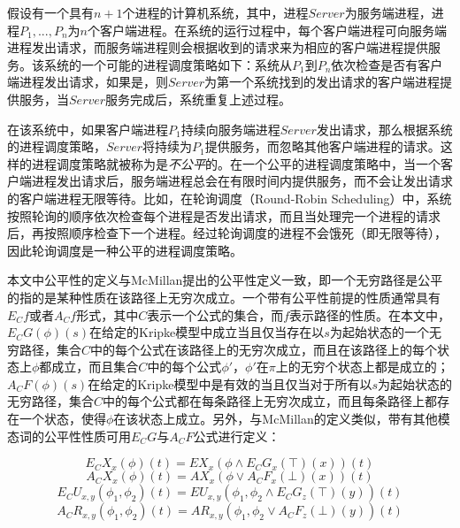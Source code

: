\begin{example} [进程调度的公平性]
	假设有一个具有$n+1$个进程的计算机系统，其中，进程$Server$为服务端进程，进程$P_1,...,P_n$为$n$个客户端进程。在系统的运行过程中，每个客户端进程可向服务端进程发出请求，而服务端进程则会根据收到的请求来为相应的客户端进程提供服务。该系统的一个可能的进程调度策略如下：系统从$P_1$到$P_n$依次检查是否有客户端进程发出请求，如果是，则$Server$为第一个系统找到的发出请求的客户端进程提供服务，当$Server$服务完成后，系统重复上述过程。
	
	在该系统中，如果客户端进程$P_1$持续向服务端进程$Server$发出请求，那么根据系统的进程调度策略，$Server$将持续为$P_1$提供服务，而忽略其他客户端进程的请求。这样的进程调度策略就被称为是\textit{不公平}的。在一个公平的进程调度策略中，当一个客户端进程发出请求后，服务端进程总会在有限时间内提供服务，而不会让发出请求的客户端进程无限等待。比如，在轮询调度（Round-Robin Scheduling）\cite{ASPBG14}中，系统按照轮询的顺序依次检查每个进程是否发出请求，而且当处理完一个进程的请求后，再按照顺序检查下一个进程。经过轮询调度的进程不会饿死（即无限等待），因此轮询调度是一种公平的进程调度策略。
\end{example}
本文中公平性的定义与McMillan提出的公平性定义\cite{mcmillan93}一致，即一个无穷路径是公平的指的是某种性质在该路径上无穷次成立。一个带有公平性前提的性质通常具有$E_Cf$或者$A_Cf$形式，其中$C$表示一个\CTLP{}公式的集合，而$f$表示路径的性质。在本文中，$E_CG(\phi)(s)$在给定的Kripke模型中成立当且仅当存在以$s$为起始状态的一个无穷路径，集合$C$中的每个公式在该路径上的无穷次成立，而且在该路径上的每个状态上$\phi$都成立，而且集合$C$中的每个公式$\phi'$，$\phi'$在$\pi$上的无穷个状态上都是成立的；$A_CF(\phi)(s)$在给定的Kripke模型中是有效的当且仅当对于所有以$s$为起始状态的无穷路径，集合$C$中的每个公式都在每条路径上无穷次成立，而且每条路径上都存在一个状态，使得$\phi$在该状态上成立。另外，与McMillan的定义类似，带有其他模态词的公平性性质可用$E_CG$与$A_CF$公式进行定义：


\begin{small}
	$$E_CX_x(\phi)(t) = EX_x(\phi \wedge E_CG_x(\top)(x))(t)$$
	$$A_CX_x(\phi)(t) = AX_x(\phi \vee A_CF_x(\bot)(x))(t)$$
	$$E_CU_{x,y}(\phi_1,\phi_2)(t) = EU_{x,y}(\phi_1, \phi_2\wedge E_CG_z(\top)(y))(t)$$
	$$A_CR_{x,y}(\phi_1,\phi_2)(t) = AR_{x,y}(\phi_1, \phi_2\vee A_CF_z(\bot)(y))(t)$$
\end{small}

